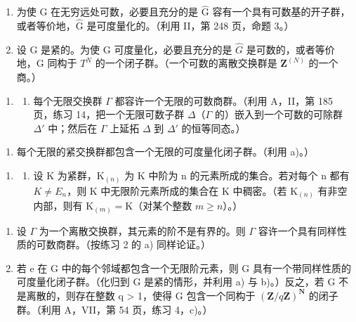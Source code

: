 \begin{enumerate}
\def\labelenumi{\alph{enumi})}
\setcounter{enumi}{1}
\item
  为使 G 在无穷远处可数，必要且充分的是 \(\widehat{\mathrm{G}}\) 容有一个具有可数基的开子群，或者等价地，\(\widehat{\mathrm{G}}\) 是可度量化的。（利用 II，第 248 页，命题 3。）
\item
  设 G 是紧的。为使 G 可度量化，必要且充分的是 \(\widehat{G}\) 是可数的，或者等价地，G 同构于 \(T^{N}\) 的一个闭子群。（一个可数的离散交换群是 \(\mathbf{Z}^{(N)}\) 的一个商。）
\end{enumerate}

\begin{enumerate}
\def\labelenumi{\arabic{enumi})}
\setcounter{enumi}{1}
\tightlist
\item
  \begin{enumerate}
  \def\labelenumii{\alph{enumii})}
  \tightlist
  \item
    每个无限交换群 \(\Gamma\) 都容许一个无限的可数商群。（利用 A，II，第 185 页，练习 14，把一个无限可数子群 \(\Delta\)（\(\Gamma\) 的）嵌入到一个可数的可除群 \(\Delta'\) 中；然后在 \(\Gamma\) 上延拓 \(\Delta\) 到 \(\Delta'\) 的恒等同态。）
  \end{enumerate}
\end{enumerate}

\begin{enumerate}
\def\labelenumi{\alph{enumi})}
\setcounter{enumi}{1}
\tightlist
\item
  每个无限的紧交换群都包含一个无限的可度量化闭子群。（利用 a)。）
\end{enumerate}

\begin{enumerate}
\def\labelenumi{\arabic{enumi})}
\setcounter{enumi}{2}
\tightlist
\item
  \begin{enumerate}
  \def\labelenumii{\alph{enumii})}
  \tightlist
  \item
    设 K 为紧群，\(\mathrm{K}_{(n)}\) 为 K 中阶为 n 的元素所成的集合。若对每个 n 都有 \(K \neq E_{n}\)，则 K 中无限阶元素所成的集合在 K 中稠密。（若 \(\mathrm{K}_{(n)}\) 有非空内部，则有 \(\mathrm{K}_{(m)} = \mathrm{K}\)（对某个整数 \(m \geqslant n\)）。）
  \end{enumerate}
\end{enumerate}

\begin{enumerate}
\def\labelenumi{\alph{enumi})}
\setcounter{enumi}{1}
\item
  设 \(\Gamma\) 为一个离散交换群，其元素的阶不是有界的。则 \(\Gamma\) 容许一个具有同样性质的可数商群。（按练习 2 的 a) 同样论证。）
\item
  若 e 在 G 中的每个邻域都包含一个无限阶元素，则 G 具有一个带同样性质的可度量化闭子群。（化归到 G 是紧的情形，并利用 a) 与 b)。）反之，若 G 不是离散的，则存在整数 q \textgreater{} 1，使得 G 包含一个同构于 \((\mathbf{Z}/q\mathbf{Z})^{\mathbf{N}}\) 的闭子群。（利用 A，VII，第 54 页，练习 4，c)。）
\end{enumerate}

